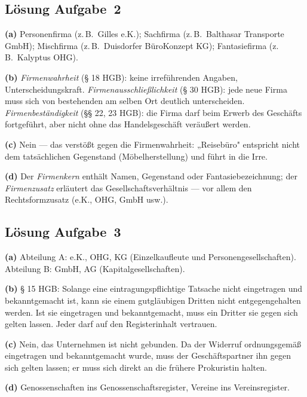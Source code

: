 \documentclass[11pt, a4paper]{article}
\begin{document}
\subsection*{Lösung Aufgabe~2}
\begin{loesung}
\textbf{(a)} Personenfirma (z.\,B.\ Gilles e.K.); Sachfirma (z.\,B.\ Balthasar Transporte
GmbH); Mischfirma (z.\,B.\ Duisdorfer BüroKonzept KG); Fantasiefirma (z.\,B.\ Kalyptus OHG).

\textbf{(b)} \emph{Firmenwahrheit} (§ 18 HGB): keine irreführenden Angaben, Unterscheidungs\-kraft.
\emph{Firmenausschließlichkeit} (§ 30 HGB): jede neue Firma muss sich von bestehenden am
selben Ort deutlich unterscheiden. \emph{Firmenbeständigkeit} (§§ 22, 23 HGB): die Firma
darf beim Erwerb des Geschäfts fortgeführt, aber nicht ohne das Handelsgeschäft veräußert
werden.

\textbf{(c)} Nein --- das verstößt gegen die Firmenwahrheit: „Reisebüro" entspricht nicht
dem tatsächlichen Gegenstand (Möbelherstellung) und führt in die Irre.

\textbf{(d)} Der \emph{Firmenkern} enthält Namen, Gegenstand oder Fantasiebezeichnung; der
\emph{Firmenzusatz} erläutert das Gesellschaftsverhältnis --- vor allem den Rechtsform\-zusatz
(e.K., OHG, GmbH usw.).
\end{loesung}

\subsection*{Lösung Aufgabe~3}
\begin{loesung}
\textbf{(a)} Abteilung A: e.K., OHG, KG (Einzelkaufleute und Personengesellschaften).
Abteilung B: GmbH, AG (Kapitalgesellschaften).

\textbf{(b)} § 15 HGB: Solange eine eintragungspflichtige Tatsache nicht eingetragen und
bekanntgemacht ist, kann sie einem gutgläubigen Dritten nicht entgegengehalten werden.
Ist sie eingetragen und bekanntgemacht, muss ein Dritter sie gegen sich gelten lassen.
Jeder darf auf den Registerinhalt vertrauen.

\textbf{(c)} Nein, das Unternehmen ist nicht gebunden. Da der Widerruf ordnungsgemäß
eingetragen und bekanntgemacht wurde, muss der Geschäftspartner ihn gegen sich gelten
lassen; er muss sich direkt an die frühere Prokuristin halten.

\textbf{(d)} Genossenschaften ins Genossenschaftsregister, Vereine ins Vereinsregister.
\end{loesung}
\end{document}
